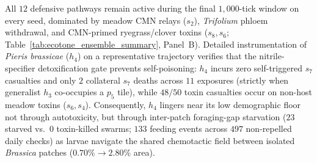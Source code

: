 All $12$ defensive pathways remain active during the final $1{,}000$-tick window on every seed, dominated by meadow CMN relays ($s_2$), \textit{Trifolium} phloem withdrawal, and CMN-primed ryegrass/clover toxins ($s_8, s_6$; Table~\ref{tab:ecotone_ensemble_summary}, Panel~B). Detailed instrumentation of \textit{Pieris brassicae} ($h_4$) on a representative trajectory verifies that the nitrile-specifier detoxification gate prevents self-poisoning: $h_4$ incurs zero self-triggered $s_7$ casualties and only $2$ collateral $s_7$ deaths across $11$ exposures (strictly when generalist $h_3$ co-occupies a $p_5$ tile), while $48/50$ toxin casualties occur on non-host meadow toxins ($s_6, s_4$). Consequently, $h_4$ lingers near its low demographic floor not through autotoxicity, but through inter-patch foraging-gap starvation ($23$ starved vs.\ $0$ toxin-killed swarms; $133$ feeding events across $497$ non-repelled daily checks) as larvae navigate the shared chemotactic field between isolated \textit{Brassica} patches ($0.70\% \to 2.80\%$ area).

